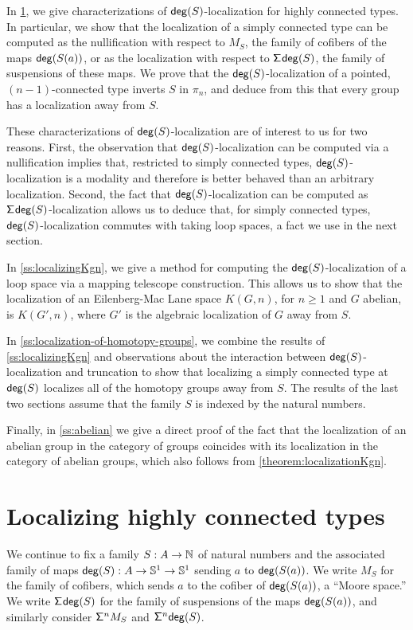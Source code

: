 In \cref{ss:n-conn}, we give characterizations of $\mathsf{deg}(S)$-localization for highly connected types. In particular, we show that the localization of a simply connected type can be computed as the nullification with respect to $M_S$, the family of cofibers of the maps $\mathsf{deg}(S(a))$, or as the localization with respect to $\mathsf{\Sigma}^{} \mathsf{deg}(S)$, the family of suspensions of these maps.
We prove that the $\mathsf{deg}(S)$-localization of a pointed, $(n-1)$-connected type inverts $S$ in $\pi_n$,
and deduce from this that every group has a localization away from $S$.

These characterizations of $\mathsf{deg}(S)$-localization are of interest to us for two reasons. First, the observation that $\mathsf{deg}(S)$-localization can be computed via a nullification implies that, restricted to simply connected types, $\mathsf{deg}(S)$-localization is a modality and therefore is better behaved than an arbitrary localization. Second, the fact that $\mathsf{deg}(S)$-localization can be computed as $\mathsf{\Sigma}^{} \mathsf{deg}(S)$-localization allows us to deduce that, for simply connected types, $\mathsf{deg}(S)$-localization commutes with taking loop spaces, a fact we use in the next section.

In \cref{ss:localizingKgn}, we give a method for computing the $\mathsf{deg}(S)$-localization of a loop space via a mapping telescope construction. This allows us to show that the localization of an Eilenberg-Mac Lane space $K(G,n)$, for $n \geq 1$ and $G$ abelian, is $K(G',n)$, where $G'$ is the algebraic localization of $G$ away from $S$.

In \cref{ss:localization-of-homotopy-groups}, we combine the results of \cref{ss:localizingKgn} and observations about the interaction between $\mathsf{deg}(S)$-localization and truncation to show that localizing a simply connected type at $\mathsf{deg}(S)$ localizes all of the homotopy groups away from $S$.
The results of the last two sections assume that the family $S$ is indexed by the natural numbers.

Finally, in \cref{ss:abelian} we give a direct proof of the fact that
the localization of an abelian group in the category of groups coincides with
its localization in the category of abelian groups, which also follows from
\cref{theorem:localizationKgn}.

\section{Localizing highly connected types}\label{ss:n-conn}

We continue to fix a family $S : A \to \mathbb{N}$ of natural numbers and the associated family
of maps $\mathsf{deg}(S) : A \to \mathbb{S}^{1} \to \mathbb{S}^{1}$ sending $a$ to $\mathsf{deg}(S(a))$.
We write $M_S$ for the family of cofibers, which sends $a$ to the cofiber
of $\mathsf{deg}(S(a))$, a ``Moore space.''
We write $\mathsf{\Sigma}^{}{\mathsf{deg}(S)}$ for the family of suspensions of the maps $\mathsf{deg}(S(a))$,
and similarly consider $\mathsf{\Sigma}^n M_S$ and $\mathsf{\Sigma}^n \mathsf{deg}(S)$.

